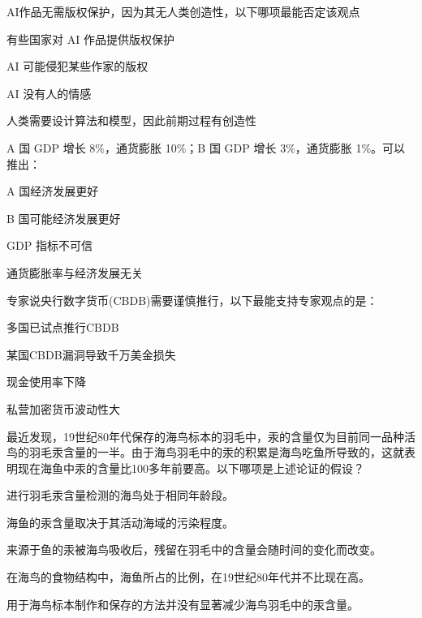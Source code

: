 \documentclass{exam-zh}
\begin{document}
\begin{question}
AI作品无需版权保护，因为其无人类创造性，以下哪项最能否定该观点 \paren[]
\begin{choices}
  \item 有些国家对 AI 作品提供版权保护
  \item AI 可能侵犯某些作家的版权
  \item AI 没有人的情感
  \item 人类需要设计算法和模型，因此前期过程有创造性
\end{choices}
\end{question}

\begin{question}
A 国 GDP 增长 8\%，通货膨胀 10\%；B 国 GDP 增长 3\%，通货膨胀 1\%。可以推出： \paren[]
\begin{choices}
  \item A 国经济发展更好
  \item B 国可能经济发展更好
  \item GDP 指标不可信
  \item 通货膨胀率与经济发展无关
\end{choices}
\end{question}

\begin{question}
专家说央行数字货币(CBDB)需要谨慎推行，以下最能支持专家观点的是： \paren[]
\begin{choices}
  \item 多国已试点推行CBDB
  \item 某国CBDB漏洞导致千万美金损失
  \item 现金使用率下降
  \item 私营加密货币波动性大
\end{choices}
\end{question}

\begin{question}
最近发现，19世纪80年代保存的海鸟标本的羽毛中，汞的含量仅为目前同一品种活鸟的羽毛汞含量的一半。由于海鸟羽毛中的汞的积累是海鸟吃鱼所导致的，这就表明现在海鱼中汞的含量比100多年前要高。以下哪项是上述论证的假设？\paren[]
\begin{choices}
  \item 进行羽毛汞含量检测的海鸟处于相同年龄段。
  \item 海鱼的汞含量取决于其活动海域的污染程度。
  \item 来源于鱼的汞被海鸟吸收后，残留在羽毛中的含量会随时间的变化而改变。
  \item 在海鸟的食物结构中，海鱼所占的比例，在19世纪80年代并不比现在高。
  \item 用于海鸟标本制作和保存的方法并没有显著减少海鸟羽毛中的汞含量。
\end{choices}
\end{question}
\end{document}

